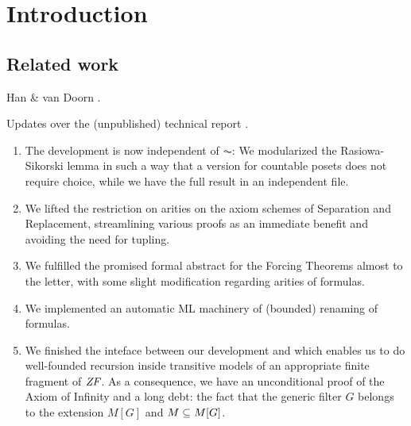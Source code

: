 \section{Introduction}

\subsection{Related work}

Han \& van Doorn \cite{han_et_al:LIPIcs:2019:11074}.

Updates over the (unpublished) technical report \cite{2019arXiv190103313G}.

\begin{enumerate}
\item The development is now independent of $\AC$: We modularized the
  Rasiowa-Sikorski lemma in such a way that a version for countable
  posets does not require choice, while we have the full result in an
  independent file.
\item We lifted the restriction on arities on the axiom schemes of
  Separation and Replacement, streamlining various proofs as an
  immediate benefit and avoiding the need for tupling. 
\item We fulfilled the promised formal abstract for the Forcing
  Theorems almost to the letter, with some slight modification
  regarding arities of formulas.
\item We implemented an automatic ML machinery of (bounded) renaming
  of formulas.
\item We finished the inteface between our development and
   which enables us to do well-founded
  recursion inside transitive models of an appropriate finite fragment
  of $\mathit{ZF}$. As a consequence, we have an unconditional proof of
  the Axiom of Infinity and a long debt: the fact that the generic
  filter $G$ belongs to the extension $M[G]$ and $M\subseteq M[G]$.
\end{enumerate}
